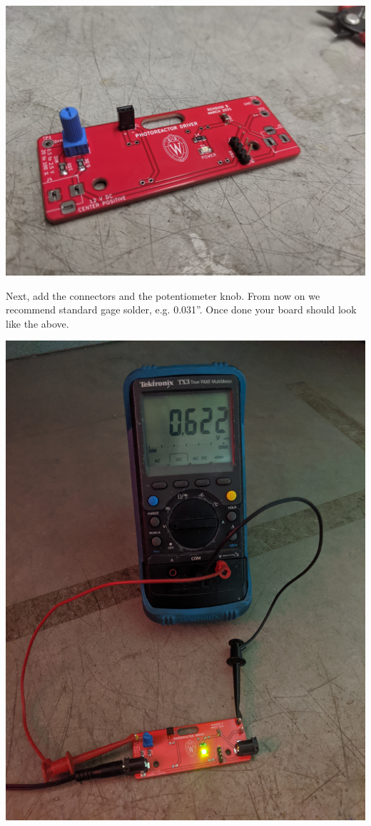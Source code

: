\documentclass[11pt]{article}
\begin{document}
\begin{center}
  \includegraphics[width=\textwidth/2]{"./connectors.jpg"}
\end{center}

Next, add the connectors and the potentiometer knob.
From now on we recommend standard gage solder, e.g. 0.031''.
Once done your board should look like the above.

\begin{center}
  \includegraphics[width=\textwidth/2]{"./barrels-tested.jpg"}
\end{center}
\end{document}
